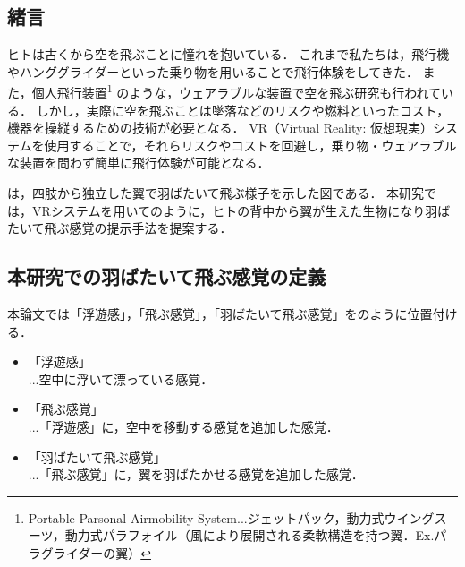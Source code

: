 \begin{small}

\section{緒言}

  ヒトは古くから空を飛ぶことに憧れを抱いている．
  これまで私たちは，飛行機やハンググライダーといった乗り物を用いることで飛行体験をしてきた．
  また，個人飛行装置\footnote{Portable Parsonal Airmobility System...ジェットパック，動力式ウイングスーツ，動力式パラフォイル（風により展開される柔軟構造を持つ翼．Ex.パラグライダーの翼）}
  のような，ウェアラブルな装置で空を飛ぶ研究も行われている\cite{gravityindustries}．
  しかし，実際に空を飛ぶことは墜落などのリスクや燃料といったコスト，機器を操縦するための技術が必要となる．
  VR（Virtual Reality: 仮想現実）システムを使用することで，それらリスクやコストを回避し，乗り物・ウェアラブルな装置を問わず簡単に飛行体験が可能となる．

  は，四肢から独立した翼で羽ばたいて飛ぶ様子を示した図である．
  本研究では，VRシステムを用いてのように，ヒトの背中から翼が生えた生物になり羽ばたいて飛ぶ感覚の提示手法を提案する．
  
  \subsection{本研究での羽ばたいて飛ぶ感覚の定義}
    本論文では「浮遊感」，「飛ぶ感覚」，「羽ばたいて飛ぶ感覚」をのように位置付ける．

    \begin{itemize}
            \item 「浮遊感」\\
            ...空中に浮いて漂っている感覚．
            \item 「飛ぶ感覚」\\
            ...「浮遊感」に，空中を移動する感覚を追加した感覚．
            \item 「羽ばたいて飛ぶ感覚」\\
            ...「飛ぶ感覚」に，翼を羽ばたかせる感覚を追加した感覚．
    \end{itemize}


\end{small}
